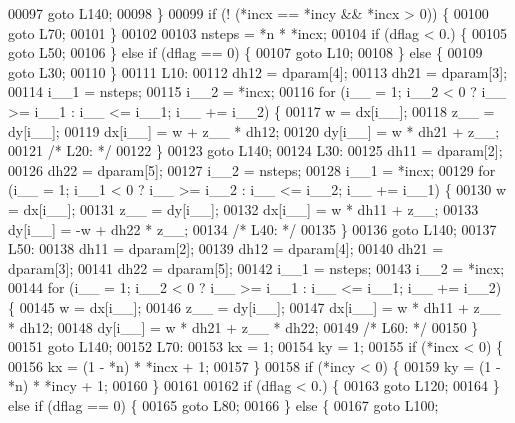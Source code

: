 \begin{DoxyCode}
00097     \textcolor{keywordflow}{goto} L140;
00098     \}
00099     \textcolor{keywordflow}{if} (! (*incx == *incy && *incx > 0)) \{
00100     \textcolor{keywordflow}{goto} L70;
00101     \}
00102 
00103     nsteps = *n * *incx;
00104     \textcolor{keywordflow}{if} (dflag < 0.) \{
00105     \textcolor{keywordflow}{goto} L50;
00106     \} \textcolor{keywordflow}{else} \textcolor{keywordflow}{if} (dflag == 0) \{
00107     \textcolor{keywordflow}{goto} L10;
00108     \} \textcolor{keywordflow}{else} \{
00109     \textcolor{keywordflow}{goto} L30;
00110     \}
00111 L10:
00112     dh12 = dparam[4];
00113     dh21 = dparam[3];
00114     i\_\_1 = nsteps;
00115     i\_\_2 = *incx;
00116     \textcolor{keywordflow}{for} (i\_\_ = 1; i\_\_2 < 0 ? i\_\_ >= i\_\_1 : i\_\_ <= i\_\_1; i\_\_ += i\_\_2) \{
00117     w = dx[i\_\_];
00118     z\_\_ = dy[i\_\_];
00119     dx[i\_\_] = w + z\_\_ * dh12;
00120     dy[i\_\_] = w * dh21 + z\_\_;
00121 \textcolor{comment}{/* L20: */}
00122     \}
00123     \textcolor{keywordflow}{goto} L140;
00124 L30:
00125     dh11 = dparam[2];
00126     dh22 = dparam[5];
00127     i\_\_2 = nsteps;
00128     i\_\_1 = *incx;
00129     \textcolor{keywordflow}{for} (i\_\_ = 1; i\_\_1 < 0 ? i\_\_ >= i\_\_2 : i\_\_ <= i\_\_2; i\_\_ += i\_\_1) \{
00130     w = dx[i\_\_];
00131     z\_\_ = dy[i\_\_];
00132     dx[i\_\_] = w * dh11 + z\_\_;
00133     dy[i\_\_] = -w + dh22 * z\_\_;
00134 \textcolor{comment}{/* L40: */}
00135     \}
00136     \textcolor{keywordflow}{goto} L140;
00137 L50:
00138     dh11 = dparam[2];
00139     dh12 = dparam[4];
00140     dh21 = dparam[3];
00141     dh22 = dparam[5];
00142     i\_\_1 = nsteps;
00143     i\_\_2 = *incx;
00144     \textcolor{keywordflow}{for} (i\_\_ = 1; i\_\_2 < 0 ? i\_\_ >= i\_\_1 : i\_\_ <= i\_\_1; i\_\_ += i\_\_2) \{
00145     w = dx[i\_\_];
00146     z\_\_ = dy[i\_\_];
00147     dx[i\_\_] = w * dh11 + z\_\_ * dh12;
00148     dy[i\_\_] = w * dh21 + z\_\_ * dh22;
00149 \textcolor{comment}{/* L60: */}
00150     \}
00151     \textcolor{keywordflow}{goto} L140;
00152 L70:
00153     kx = 1;
00154     ky = 1;
00155     \textcolor{keywordflow}{if} (*incx < 0) \{
00156     kx = (1 - *n) * *incx + 1;
00157     \}
00158     \textcolor{keywordflow}{if} (*incy < 0) \{
00159     ky = (1 - *n) * *incy + 1;
00160     \}
00161 
00162     \textcolor{keywordflow}{if} (dflag < 0.) \{
00163     \textcolor{keywordflow}{goto} L120;
00164     \} \textcolor{keywordflow}{else} \textcolor{keywordflow}{if} (dflag == 0) \{
00165     \textcolor{keywordflow}{goto} L80;
00166     \} \textcolor{keywordflow}{else} \{
00167     \textcolor{keywordflow}{goto} L100;

\end{DoxyCode}
